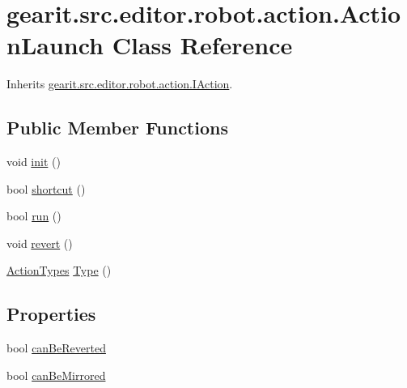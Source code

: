 \hypertarget{classgearit_1_1src_1_1editor_1_1robot_1_1action_1_1_action_launch}{\section{gearit.\+src.\+editor.\+robot.\+action.\+Action\+Launch Class Reference}
\label{classgearit_1_1src_1_1editor_1_1robot_1_1action_1_1_action_launch}
}


Inherits \hyperlink{interfacegearit_1_1src_1_1editor_1_1robot_1_1action_1_1_i_action}{gearit.\+src.\+editor.\+robot.\+action.\+I\+Action}.

\subsection*{Public Member Functions}
\begin{DoxyCompactItemize}
\item 
void \hyperlink{classgearit_1_1src_1_1editor_1_1robot_1_1action_1_1_action_launch_a9b3cf5db0304a4839f808156a433ab7e}{init} ()
\item 
bool \hyperlink{classgearit_1_1src_1_1editor_1_1robot_1_1action_1_1_action_launch_a8cc4e69935dd5e23c37e23dedc8633c2}{shortcut} ()
\item 
bool \hyperlink{classgearit_1_1src_1_1editor_1_1robot_1_1action_1_1_action_launch_a4e222cd3457210388cda57de600c8549}{run} ()
\item 
void \hyperlink{classgearit_1_1src_1_1editor_1_1robot_1_1action_1_1_action_launch_ab27cba815d22937a6979e84b0d5fd823}{revert} ()
\item 
\hyperlink{namespacegearit_1_1src_1_1editor_1_1robot_1_1action_a4be0fd46e3952d6135136b20e7b3fc5e}{Action\+Types} \hyperlink{classgearit_1_1src_1_1editor_1_1robot_1_1action_1_1_action_launch_a5f8522a89ae15eed37ce81b643503188}{Type} ()
\end{DoxyCompactItemize}
\subsection*{Properties}
\begin{DoxyCompactItemize}
\item 
bool \hyperlink{classgearit_1_1src_1_1editor_1_1robot_1_1action_1_1_action_launch_a6f503a24a8ebb38cf80e52430a6e05c0}{can\+Be\+Reverted}
\item 
bool \hyperlink{classgearit_1_1src_1_1editor_1_1robot_1_1action_1_1_action_launch_a816359146587857ebb59475a25d553f6}{can\+Be\+Mirrored}
\end{DoxyCompactItemize}


